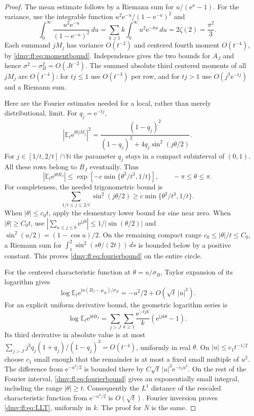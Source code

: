 \documentclass[11pt,letterpaper]{article}
\numberwithin{equation}{section}
\theoremstyle{definition}\newtheorem{definition}[theorem]{Definition}
\theoremstyle{remark}\newtheorem{remark}[theorem]{Remark}
\newcommand{\N}{\mathbb N}
\newcommand{\E}{\mathbb E}
\newcommand{\ii}{\mathrm i}
\newcommand{\ee}{\mathrm e}
\begin{document}
\begin{proof}
The mean estimate follows by a Riemann sum for $u/(\ee^u-1)$.
For the variance, use the integrable function
$u^2\ee^{-u}/(1-\ee^{-u})^2$ and
\[
 \int_0^\infty\frac{u^2\ee^{-u}}{(1-\ee^{-u})^2}\,du
 =\sum_{k\ge1}k\int_0^\infty u^2\ee^{-ku}\,du
 =2\zeta(2)=\frac{\pi^2}3.
\]
Each summand $jM_j$ has variance $O(t^{-2})$ and centered fourth
moment $O(t^{-4})$, by \eqref{dmv:fl:eq:momentbound}. Independence gives the
two bounds for $A_J$ and hence $\sigma^2-\sigma_B^2=O(Jt^{-2})$.
The summed absolute third centered moments of all $jM_j$ are
$O(t^{-4})$: for $tj\le1$ use $O(t^{-3})$ per row, and for $tj>1$
use $O(j^3\ee^{-tj})$ and a Riemann sum.

Here are the Fourier estimates needed for a local, rather than merely
distributional, limit. For $q_j=\ee^{-tj}$,
\[
 \left|\E_t\ee^{\ii\theta jM_j}\right|^2
 =\frac{(1-q_j)^2}{(1-q_j)^2+4q_j\sin^2(j\theta/2)}.
\]
For $j\in[1/t,2/t]\cap\N$ the parameter $q_j$ stays in a compact
subinterval of $(0,1)$. All these rows belong to $B_J$ eventually. Thus
\begin{equation}\label{dmv:fl:eq:fourierbound}
 |\E_t\ee^{\ii\theta B_J}|
 \le\exp\left[-c\min\{\theta^2/t^3,1/t\}\right],
 \qquad -\pi\le\theta\le\pi.
\end{equation}
For completeness, the needed trigonometric bound is
\[
 \sum_{1/t\le j\le2/t}\sin^2(j\theta/2)
 \ge c\min\{\theta^2/t^3,1/t\}.
\]
When $|\theta|\le c_0t$, apply the elementary lower bound for sine
near zero. When $|\theta|\ge C_0t$, use
$|\sum_{a\le j\le b}\ee^{\ii j\theta}|\le1/|\sin(\theta/2)|$
and $\sin^2(u/2)=(1-\cos u)/2$. On the remaining compact range
$c_0\le|\theta|/t\le C_0$, a Riemann sum for
$\int_1^2\sin^2(s\theta/(2t))\,ds$ is bounded below by a positive
constant. This proves \eqref{dmv:fl:eq:fourierbound} on the entire circle.

For the centered characteristic function at
$\theta=u/\sigma_B$, Taylor expansion of its logarithm gives
\[
 \log\E_t\ee^{\ii u(B_J-\mu_B)/\sigma_B}
 =-u^2/2+O(\sqrt t\,|u|^3).
\]
For an explicit uniform derivative bound, the geometric logarithm series is
\[
 \log\E_t\ee^{\ii\theta B_J}
 =\sum_{j>J}\sum_{k\ge1}\frac{\ee^{-tjk}}{k}
       (\ee^{\ii jk\theta}-1).
\]
Its third derivative in absolute value is at most
$\sum_{j>J}j^3q_j(1+q_j)/(1-q_j)^3=O(t^{-4})$, uniformly in real
$\theta$. On $|u|\le c_1t^{-1/2}$ choose $c_1$ small
enough that the remainder is at most a fixed small multiple of $u^2$.
The difference from $\ee^{-u^2/2}$ is bounded there by
$C\sqrt t\,|u|^3\ee^{-c_2u^2}$.
On the rest of the Fourier interval, \eqref{dmv:fl:eq:fourierbound} gives an
exponentially small integral, including the range $|\theta|\ge t$.
Consequently the $L^1$ distance of the rescaled characteristic function
from $\ee^{-u^2/2}$ is $O(\sqrt t)$. Fourier inversion proves
\eqref{dmv:fl:eq:LLT}, uniformly in $k$. The proof for $N$ is the same.
\end{proof}
\end{document}
